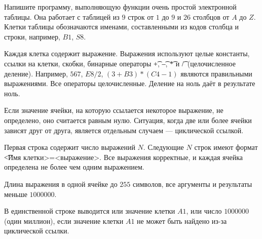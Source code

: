 Напишите программу, выполняющую функции очень простой электронной таблицы. Она работает с таблицей из $9$ строк от $1$ до $9$ и $26$ столбцов от $A$ до $Z$. Клетки таблицы обозначаются именами, составленными из кодов столбца и строки, например, $B1$, $S8$. 

Каждая клетка содержит выражение. Выражения используют целые константы, ссылки на клетки, скобки, бинарные операторы \t{+}, \t{--}, \t{*} и \t{/}~(целочисленное деление). Например, $567$, $E8/2$, $(3+B3)*(C4-1)$ являются правильными выражениями. Все операторы целочисленные. Деление на ноль даёт в результате ноль. 

Если значение ячейки, на которую ссылается некоторое выражение, не определено, оно считается равным нулю. Ситуация, когда две или более ячейки зависят друг от друга, является отдельным случаем --- циклической ссылкой. 

\InputFile

Первая строка содержит число выражений $N$. Следующие $N$ строк имеют формат \t{<Имя клетки>=<выражение>}. Все выражения корректные, и каждая ячейка определена не более чем одним выражением. 

Длина выражения в одной ячейке до $255$ символов, все аргументы и результаты меньше $1000000$. 

\OutputFile

В единственной строке выводится или значение клетки $A1$, или число $1000000$ (один миллион), если значение клетки $A1$ не может быть найдено из-за циклической ссылки. 

\SAMPLES
